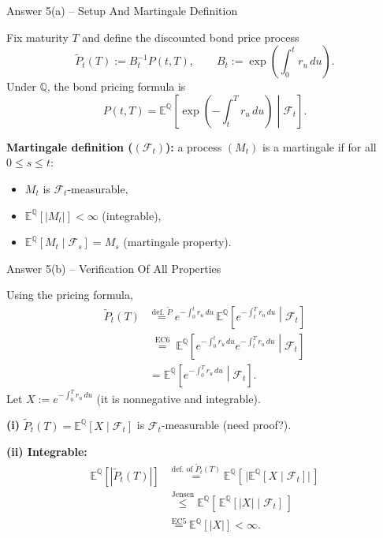 \documentclass[compress]{beamer}
\begin{document}
\begin{frame}{Answer 5(a) -- Setup And Martingale Definition}
    {\small
    Fix maturity $T$ and define the discounted bond price process
    \[
        \widetilde P_t(T):=B_t^{-1}P(t,T),
        \qquad
        B_t:=\exp\!\left(\int_0^t r_u\,du\right).
    \]
    Under $\mathbb Q$, the bond pricing formula is
    \[
        P(t,T)=\mathbb E^{\mathbb Q}\!\left[\exp\!\left(-\int_t^T r_u\,du\right)\middle|\mathcal F_t\right].
    \]

    \textbf{Martingale definition ($(\mathcal F_t)$):} a process $(M_t)$ is a martingale if for all $0\le s\le t$:
    \begin{itemize}
        \item[(i)] $M_t$ is $\mathcal F_t$-measurable,
        \item[(ii)] $\mathbb E^{\mathbb Q}[|M_t|]<\infty$ (integrable),
        \item[(iii)] $\mathbb E^{\mathbb Q}[M_t\mid \mathcal F_s]=M_s$ (martingale property).
    \end{itemize}
    }
\end{frame}

\begin{frame}{Answer 5(b) -- Verification Of All Properties}
    {\small
    Using the pricing formula,
    \begin{align*}
        \widetilde P_t(T)
        &\overset{\text{def. }\widetilde P}{=}
        e^{-\int_0^t r_u\,du}\,\mathbb E^{\mathbb Q}\!\left[e^{-\int_t^T r_u\,du}\middle|\mathcal F_t\right]\\
        &\overset{\substack{\text{EC6}}}{=}\mathbb E^{\mathbb Q}\!\left[e^{-\int_0^t r_u\,du}e^{-\int_t^T r_u\,du}\middle|\mathcal F_t\right]\\
        &\overset{\text{}}{=} \mathbb E^{\mathbb Q}\!\left[e^{-\int_0^T r_u\,du}\middle|\mathcal F_t\right].
    \end{align*}
    Let $X:=e^{-\int_0^T r_u\,du}$ (it is nonnegative and integrable).

    \textbf{(i)} $\widetilde P_t(T)=\mathbb E^{\mathbb Q}[X\mid\mathcal F_t]$ is $\mathcal F_t$-measurable (need proof?).

    \textbf{(ii) Integrable:}
    \begin{align*}
        \mathbb E^{\mathbb Q}[|\widetilde P_t(T)|]
        &\overset{\text{def. of }\widetilde P_t(T)}{=}
        \mathbb E^{\mathbb Q}\!\left[\,\big|\mathbb E^{\mathbb Q}[X\mid\mathcal F_t]\big|\,\right]\\
        &\overset{\text{Jensen}}{\le} 
		\mathbb E^{\mathbb Q}\!\left[\,\mathbb E^{\mathbb Q}[|X|\mid\mathcal F_t]\,\right]\\
		&\overset{\text{EC5}}{=}\mathbb E^{\mathbb Q}[|X|]
        <\infty.
    \end{align*}

	
    }
\end{frame}
\end{document}
